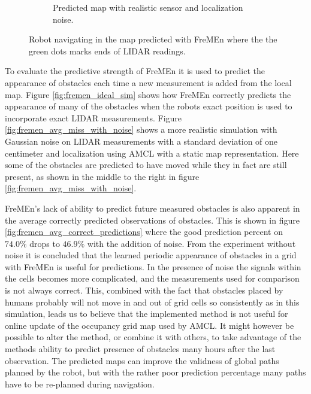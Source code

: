 \begin{figure}[htbp]
\begin{subfigure}[t]{0.49\textwidth}
        \caption{Predicted map with realistic sensor and localization noise.}
        \label{fig:fremen_sim_with_noise}
    \end{subfigure}
    \caption{Robot navigating in the map predicted with FreMEn where the the green dots marks ends of LIDAR readings.}
\end{figure}

To evaluate the predictive strength of FreMEn it is used to predict the appearance of obstacles each time a new measurement is added from the local map. 
Figure \ref{fig:fremen_ideal_sim} shows how FreMEn correctly predicts the appearance of many of the obstacles when the robots exact position is used to incorporate exact LIDAR measurements. 
Figure \ref{fig:fremen_avg_miss_with_noise} shows a more realistic simulation with Gaussian noise on LIDAR measurements with a standard deviation of one centimeter and localization using AMCL with a static map representation.
Here some of the obstacles are predicted to have moved while they in fact are still present, as shown in the middle to the right in figure \ref{fig:fremen_avg_miss_with_noise}.

FreMEn's lack of ability to predict future measured obstacles is also apparent in the average correctly predicted observations of obstacles. 
This is shown in figure \ref{fig:fremen_avg_correct_predictions} where the good prediction percent on $74.0\%$ drops to $46.9\%$ with the addition of noise.
From the experiment without noise it is concluded that the learned periodic appearance of obstacles in a grid with FreMEn is useful for predictions.
In the presence of noise the signals within the cells becomes more complicated, and the measurements used for comparison is not always correct.
This, combined with the fact that obstacles placed by humans probably will not move in and out of grid cells so consistently as in this simulation, leads us to believe that the implemented method is not useful for online update of the occupancy grid map used by AMCL.
It might however be possible to alter the method, or combine it with others, to take advantage of the methods ability to predict presence of obstacles many hours after the last observation.
The predicted maps can improve the validness of global paths planned by the robot, but with the rather poor prediction percentage many paths have to be re-planned during navigation. 

